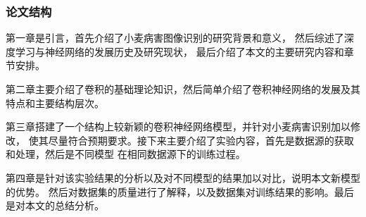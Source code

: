   \subsubsection{\hei\sihao\textbf{论文结构}}
    第一章是引言，首先介绍了小麦病害图像识别的研究背景和意义，
    然后综述了深度学习与神经网络的发展历史及研究现状，
    最后介绍了本文的主要研究内容和章节安排。

    第二章主要介绍了卷积的基础理论知识，然后简单介绍了卷积神经网络的发展及其特点和主要结构层次。

    第三章搭建了一个结构上较新颖的卷积神经网络模型，并针对小麦病害识别加以修改，
    使其尽量符合预期要求。接下来主要介绍了实验内容，首先是数据源的获取和处理，然后是不同模型
    在相同数据源下的训练过程。

    第四章是针对该实验结果的分析以及对不同模型的结果加以对比，说明本文新模型的优势。
    然后对数据集的质量进行了解释，以及数据集对训练结果的影响。最后是对本文的总结分析。
